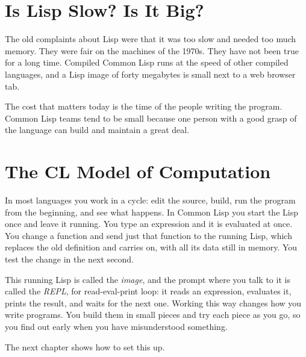 \section{Is Lisp Slow? Is It Big?}

The old complaints about Lisp were that it was too slow and needed too
much memory. They were fair on the machines of the 1970s. They have
not been true for a long time. Compiled Common Lisp runs at the speed
of other compiled languages, and a Lisp image of forty megabytes is
small next to a web browser tab.

The cost that matters today is the time of the people writing the
program. Common Lisp teams tend to be small because one person with a
good grasp of the language can build and maintain a great deal.

\section{The CL Model of Computation}

In most languages you work in a cycle: edit the source, build, run the
program from the beginning, and see what happens. In Common Lisp you
start the Lisp once and leave it running. You type an expression and
it is evaluated at once. You change a function and send just that
function to the running Lisp, which replaces the old definition and
carries on, with all its data still in memory. You test the change in
the next second.

This running Lisp is called the \emph{image}, and the prompt where
you talk to it is called the \emph{REPL}, for read-eval-print loop: it
reads an expression, evaluates it, prints the result, and waits for
the next one. Working this way changes how you write programs. You
build them in small pieces and try each piece as you go, so you find
out early when you have misunderstood something.

The next chapter shows how to set this up.
